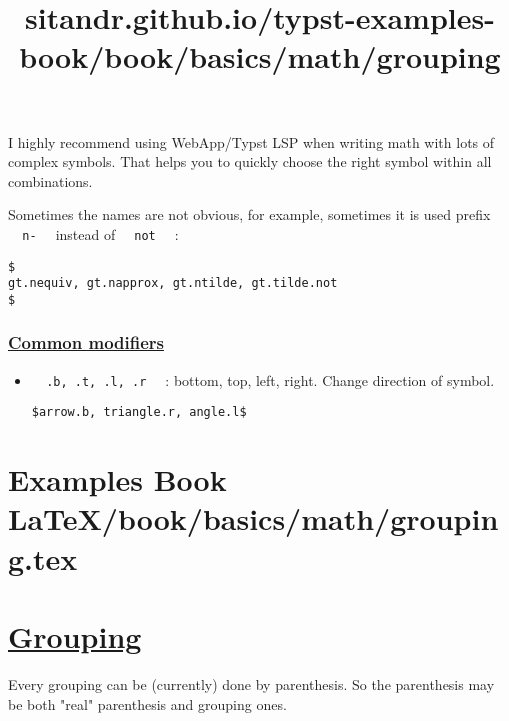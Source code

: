 \pandocbounded{}

I highly recommend using WebApp/Typst LSP when writing math with lots of
complex symbols. That helps you to quickly choose the right symbol
within all combinations.

Sometimes the names are not obvious, for example, sometimes it is used
prefix \texttt{\ }{\texttt{\ n-\ }}\texttt{\ } instead of
\texttt{\ }{\texttt{\ not\ }}\texttt{\ } :

\begin{verbatim}
$
gt.nequiv, gt.napprox, gt.ntilde, gt.tilde.not
$
\end{verbatim}

\pandocbounded{}

\subsubsection{\texorpdfstring{\hyperref[common-modifiers]{Common
modifiers}}{Common modifiers}}\label{common-modifiers}

\begin{itemize}
\item
  \texttt{\ }{\texttt{\ .b,\ .t,\ .l,\ .r\ }}\texttt{\ } : bottom, top,
  left, right. Change direction of symbol.

\begin{verbatim}
$arrow.b, triangle.r, angle.l$
\end{verbatim}

  \pandocbounded{}
\end{itemize}


\section{Examples Book LaTeX/book/basics/math/grouping.tex}
\title{sitandr.github.io/typst-examples-book/book/basics/math/grouping}

\section{\texorpdfstring{\hyperref[grouping]{Grouping}}{Grouping}}\label{grouping}

Every grouping can be (currently) done by parenthesis. So the
parenthesis may be both "real" parenthesis and grouping ones.

